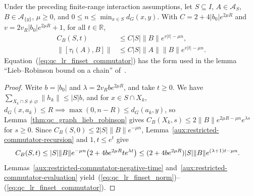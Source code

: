 \begin{theorem}
    \label{thm:qc_graph_lieb_robinson_finset}
    \leanok
    Under the preceding finite-range interaction assumptions, let $S\subseteq I$, $A\in\mathcal A_S$, $B\in\mathcal A_{\{y\}}$, $\mu\geq0$, and $0\le n\leq\min_{x\in S}d_G(x,y)$. With $C=2+4|b_0|e^{2\mu R}$ and $v=2v_R|b_0|e^{2\mu R}+1$, for all $t\in\mathbb R$,
    \begin{align}
        C_B(S,t)          & \leq C|S|\|B\|e^{v|t|-\mu n},
        \label{eq:qc_lr_finset_norm}                           \\
        \|[\tau_t(A),B]\| & \leq C|S|\|A\|\|B\|e^{v|t|-\mu n}.
        \label{eq:qc_lr_finset_commutator}
    \end{align}
    Equation~(\ref{eq:qc_lr_finset_commutator}) has the form used in the lemma ``Lieb--Robinson bound on a chain'' of~\cite{TNLean2026OneDimensional}.
\end{theorem}
\begin{proof}\leanok
    Write $b=|b_0|$ and $\lambda=2v_Rbe^{2\mu R}$, and take $t\geq0$. We have $\sum_{X_k\cap S\ne\varnothing}\|h_k\|\leq |S|b$, and for $x\in S\cap X_k$, $d_G(x,a_k)\le R\implies\max(0,n-R)\le d_G(a_k,y)$, so Lemma~\ref{thm:qc_graph_lieb_robinson} gives $C_B(X_k,s)\le 2\|B\|e^{2\mu R-\mu n}e^{\lambda s}$ for $s\ge0$. Since $C_B(S,0)\le 2|S|\|B\|e^{-\mu n}$, Lemma~\ref{aux:restricted-commutator-recursion} and $1,t\le e^t$ give
    \begin{align}
        C_B(S,t)
         & \leq |S|\|B\|e^{-\mu n}
        \bigl(2+4be^{2\mu R}t e^{\lambda t}\bigr)
        \leq (2+4be^{2\mu R})|S|\|B\|
        e^{(\lambda+1)t-\mu n}.\notag
    \end{align}
    Lemmas~\ref{aux:restricted-commutator-negative-time} and~\ref{aux:restricted-commutator-evaluation} yield~(\ref{eq:qc_lr_finset_norm})--(\ref{eq:qc_lr_finset_commutator}).
\end{proof}

